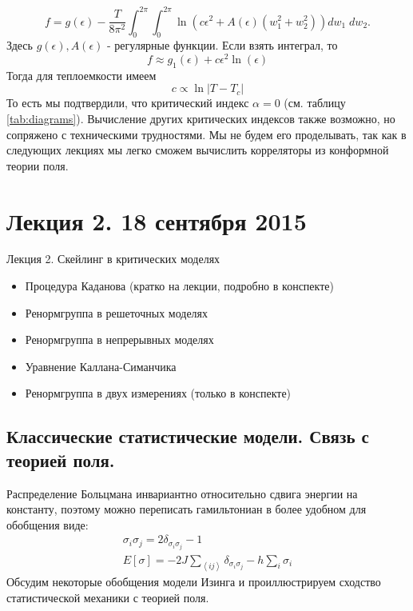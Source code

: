 \documentclass[a4paper,12pt]{article} \usepackage[utf8x]{inputenc} \usepackage[russian]{babel}
\theoremstyle{definition} \newtheorem{corollary}{Corollary}[theorem] \theoremstyle{definition}
\begin{document}
\begin{equation}
  \label{eq:141} f=g(\epsilon)-\frac{T}{8\pi^2}\int_{0}^{2\pi}\int_0^{2\pi}\ln \left( c\epsilon^2
+A(\epsilon)(w_1^2+w_2^2)\right)dw_1\;dw_2.
\end{equation} Здесь $g(\epsilon), A(\epsilon)$ - регулярные функции. Если взять интеграл, то
\begin{equation}
  \label{eq:142} f\approx g_1 (\epsilon)+c\epsilon^2 \ln(\epsilon)
\end{equation} Тогда для теплоемкости имеем
\begin{equation}
  \label{eq:143} c\propto \ln|T-T_c|
\end{equation} То есть мы подтвердили, что критический индекс $\alpha=0$ (см. таблицу
\ref{tab:diagrams}). Вычисление других критических индексов также возможно, но сопряжено с
техническими трудностями. Мы не будем его проделывать, так как в следующих лекциях мы легко сможем
вычислить корреляторы из конформной теории поля.




\section{Лекция 2. 18 сентября 2015}
\label{sec:-2}


 Лекция 2. Скейлинг в критических моделях
  \begin{itemize}
  \item Процедура Каданова (кратко на лекции, подробно в конспекте)
  \item Ренормгруппа в решеточных моделях
  \item Ренормгруппа в непрерывных моделях
  \item Уравнение Каллана-Симанчика
  \item Ренормгруппа в двух измерениях (только в конспекте)
  \end{itemize}

\subsection{Классические статистические модели. Связь с теорией поля.}
\label{sec:statistical-models-qft}

Распределение Больцмана инвариантно относительно сдвига энергии на константу, поэтому можно
переписать гамильтониан в более удобном для обобщения виде:
\begin{equation}
  \label{eq:12}
  \begin{array}{l} \sigma_i\sigma_j=2\delta_{\sigma_i\sigma_j}-1\\
E[\sigma]=-2J\sum_{\left<ij\right>}\delta_{\sigma_i\sigma_j}-h\sum_i \sigma_i
  \end{array}
\end{equation} Обсудим некоторые обобщения модели Изинга и проиллюстрируем сходство статистической
механики с теорией поля.
\end{document}
